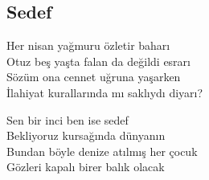 \subsection{Sedef}

Her nisan yağmuru özletir baharı \\
Otuz beş yaşta falan da değildi esrarı \\
Sözüm ona cennet uğruna yaşarken \\
İlahiyat kurallarında mı saklıydı diyarı?

\noindent\newline
Sen bir inci ben ise sedef \\
Bekliyoruz kursağında dünyanın \\
Bundan böyle denize atılmış her çocuk \\
Gözleri kapalı birer balık olacak